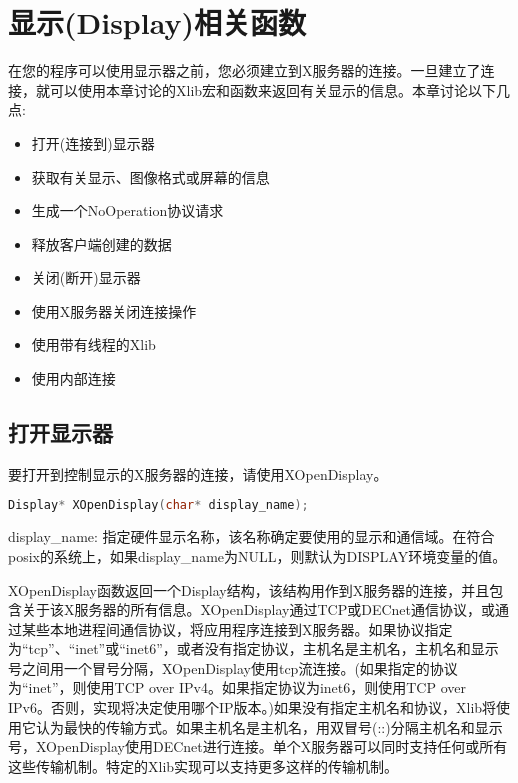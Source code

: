 \section{显示(Display)相关函数}

\noindent 在您的程序可以使用显示器之前，您必须建立到X服务器的连接。一旦建立了连接，就可以使用本章讨论的Xlib宏和函数来返回有关显示的信息。本章讨论以下几点:

\begin{itemize}
	\item 打开(连接到)显示器
	\item 获取有关显示、图像格式或屏幕的信息
	\item 生成一个NoOperation协议请求
	\item 释放客户端创建的数据
	\item 关闭(断开)显示器
	\item 使用X服务器关闭连接操作
	\item 使用带有线程的Xlib
	\item 使用内部连接
\end{itemize}

\subsection{打开显示器}

要打开到控制显示的X服务器的连接，请使用XOpenDisplay。

\begin{lstlisting}[language=C]
	Display* XOpenDisplay(char* display_name);
\end{lstlisting}

\begin{note}
	display\_name: 指定硬件显示名称，该名称确定要使用的显示和通信域。在符合posix的系统上，如果display\_name为NULL，则默认为DISPLAY环境变量的值。
\end{note}

XOpenDisplay函数返回一个Display结构，该结构用作到X服务器的连接，并且包含关于该X服务器的所有信息。XOpenDisplay通过TCP或DECnet通信协议，或通过某些本地进程间通信协议，将应用程序连接到X服务器。如果协议指定为“tcp”、“inet”或“inet6”，或者没有指定协议，主机名是主机名，主机名和显示号之间用一个冒号分隔，XOpenDisplay使用tcp流连接。(如果指定的协议为“inet”，则使用TCP over IPv4。如果指定协议为inet6，则使用TCP over IPv6。否则，实现将决定使用哪个IP版本。)如果没有指定主机名和协议，Xlib将使用它认为最快的传输方式。如果主机名是主机名，用双冒号(::)分隔主机名和显示号，XOpenDisplay使用DECnet进行连接。单个X服务器可以同时支持任何或所有这些传输机制。特定的Xlib实现可以支持更多这样的传输机制。

